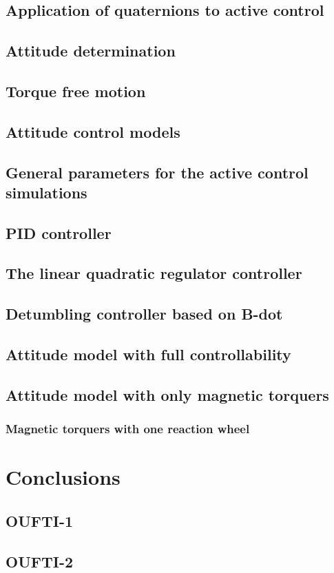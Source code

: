 \documentclass[10pt]{article}
\begin{document}
\subsection{Application of quaternions to active control}
\subsection{Attitude determination}
\subsection{Torque free motion}
\subsection{Attitude control models}
\subsection{General parameters for the active control simulations}
\subsection{PID controller}
\subsection{The linear quadratic regulator controller}
\subsection{Detumbling controller based on B-dot}
\subsection{Attitude model with full controllability}
\subsection{Attitude model with only magnetic torquers}
\subsubsection{Magnetic torquers with one reaction wheel}
\section{Conclusions}
\subsection{OUFTI-1}
\subsection{OUFTI-2}
\end{document}
